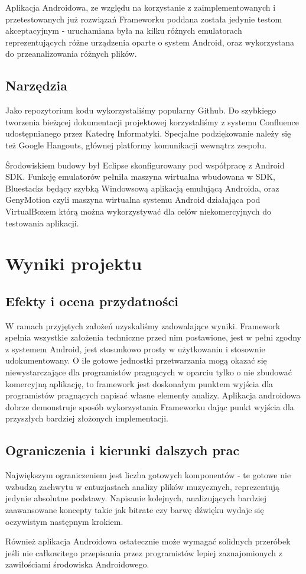 Aplikacja Androidowa, ze względu na korzystanie z zaimplementowanych i przetestowanych już rozwiązań Frameworku poddana została jedynie testom akceptacyjnym - uruchamiana była na kilku różnych emulatorach reprezentujących różne urządzenia oparte o system Android, oraz wykorzystana do przeanalizowania różnych plików.
\section{Narzędzia}
Jako repozytorium kodu wykorzystaliśmy popularny Github. Do szybkiego tworzenia bieżącej dokumentacji projektowej korzystaliśmy z systemu Confluence udostępnianego przez Katedrę Informatyki. Specjalne podziękowanie należy się też Google Hangouts, głównej platformy komunikacji wewnątrz zespołu.

Środowiskiem budowy był Eclipse skonfigurowany pod współpracę z Android SDK. Funkcję emulatorów pełniła maszyna wirtualna wbudowana w SDK, Bluestacks będący szybką Windowsową aplikacją emulującą Androida, oraz GenyMotion czyli maszyna wirtualna systemu Android działająca pod VirtualBoxem którą można wykorzystywać dla celów niekomercyjnych do testowania aplikacji.

\chapter{Wyniki projektu}
\section{Efekty i ocena przydatności}
W ramach przyjętych założeń uzyskaliśmy zadowalające wyniki. Framework spełnia wszystkie założenia techniczne przed nim postawione, jest w pełni zgodny z systemem Android, jest stosunkowo prosty w użytkowaniu i stosownie udokumentowany. O ile gotowe jednostki przetwarzania mogą okazać się niewystarczające dla programistów pragnących w oparciu tylko o nie zbudować komercyjną aplikację, to framework jest doskonałym punktem wyjścia dla programistów pragnących napisać własne elementy analizy. Aplikacja androidowa dobrze demonstruje sposób wykorzystania Frameworku dając punkt wyjścia dla przyszłych bardziej złożonych implementacji.

\section{Ograniczenia i kierunki dalszych prac}
Największym ograniczeniem jest liczba gotowych komponentów - te gotowe nie wzbudzą zachwytu w entuzjastach analizy plików muzycznych, reprezentują jedynie absolutne podstawy. Napisanie kolejnych, analizujących bardziej zaawansowane koncepty takie jak bitrate czy barwę dźwięku wydaje się oczywistym następnym krokiem.

Również aplikacja Androidowa ostatecznie może wymagać solidnych przeróbek jeśli nie całkowitego przepisania przez programistów lepiej zaznajomionych z zawiłościami środowiska Androidowego.

\nocite{*}


